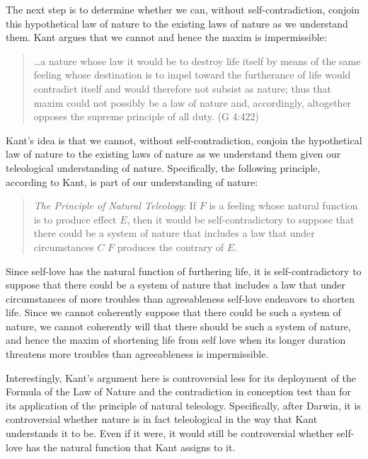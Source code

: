 The next step is to determine whether we can, without self-contradiction, conjoin this hypothetical law of nature to the existing laws of nature as we understand them. Kant argues that we cannot and hence the maxim is impermissible:

\begin{quote}
	\ldots a nature whose law it would be to destroy life itself by means of the same feeling whose destination is to impel toward the furtherance of life would contradict itself and would therefore not subsist as nature; thus that maxim could not possibly be a law of nature and, accordingly, altogether opposes the supreme principle of all duty. (G 4:422)
\end{quote}

Kant's idea is that we cannot, without self-contradiction, conjoin the hypothetical law of nature to the existing laws of nature as we understand them given our teleological understanding of nature. Specifically, the following principle, according to Kant, is part of our understanding of nature:

\begin{quote}
	\emph{The Principle of Natural Teleology}: If $F$ is a feeling whose natural function is to produce effect $E$, then it would be self-contradictory to suppose that there could be a system of nature that includes a law that under circumstances $C$ $F$ produces the contrary of $E$.
\end{quote}

Since self-love has the natural function of furthering life, it is self-contradictory to suppose that there could be a system of nature that includes a law that under circumstances of more troubles than agreeableness self-love endeavors to shorten life. Since we cannot coherently suppose that there could be such a system of nature, we cannot coherently will that there should be such a system of nature, and hence the maxim of shortening life from self love when its longer duration threatens more troubles than agreeableness is impermissible.

Interestingly, Kant's argument here is controversial less for its deployment of the Formula of the Law of Nature and the contradiction in conception test than for its application of the principle of natural teleology. Specifically, after Darwin, it is controversial whether nature is in fact teleological in the way that Kant understands it to be. Even if it were, it would still be controversial whether self-love has the natural function that Kant assigns to it. \change

